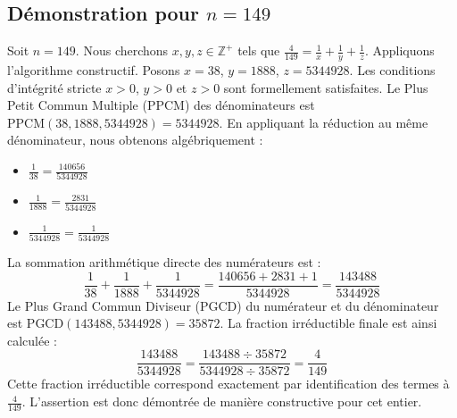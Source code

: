 \documentclass[11pt,a4paper]{article}
\begin{document}
\subsection{Démonstration pour $n = 149$}
Soit $n = 149$. Nous cherchons $x, y, z \in \mathbb{Z}^{+}$ tels que $\frac{4}{149} = \frac{1}{x} + \frac{1}{y} + \frac{1}{z}$.
Appliquons l'algorithme constructif. Posons $x = 38$, $y = 1888$, $z = 5344928$.
Les conditions d'intégrité stricte $x > 0$, $y > 0$ et $z > 0$ sont formellement satisfaites.
Le Plus Petit Commun Multiple (PPCM) des dénominateurs est $\text{PPCM}(38, 1888, 5344928) = 5344928$.
En appliquant la réduction au même dénominateur, nous obtenons algébriquement :
\begin{itemize}
    \item $\frac{1}{38} = \frac{140656}{5344928}$
    \item $\frac{1}{1888} = \frac{2831}{5344928}$
    \item $\frac{1}{5344928} = \frac{1}{5344928}$
\end{itemize}
La sommation arithmétique directe des numérateurs est :
$$ \frac{1}{38} + \frac{1}{1888} + \frac{1}{5344928} = \frac{140656 + 2831 + 1}{5344928} = \frac{143488}{5344928} $$
Le Plus Grand Commun Diviseur (PGCD) du numérateur et du dénominateur est $\text{PGCD}(143488, 5344928) = 35872$.
La fraction irréductible finale est ainsi calculée :
$$ \frac{143488}{5344928} = \frac{143488 \div 35872}{5344928 \div 35872} = \frac{4}{149} $$
Cette fraction irréductible correspond exactement par identification des termes à $\frac{4}{149}$. L'assertion est donc démontrée de manière constructive pour cet entier.
\end{document}
